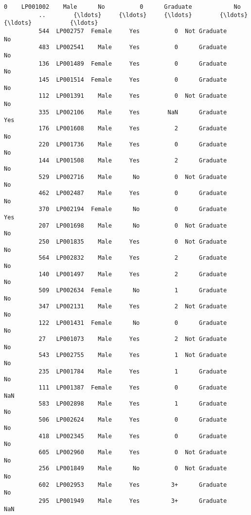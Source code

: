\documentclass[11pt]{article}
\begin{document}
\begin{Verbatim}[commandchars=\\\{\}]
          0    LP001002    Male      No          0      Graduate            No   
          ..        {\ldots}     {\ldots}     {\ldots}        {\ldots}           {\ldots}           {\ldots}   
          544  LP002757  Female     Yes          0  Not Graduate            No   
          483  LP002541    Male     Yes          0      Graduate            No   
          136  LP001489  Female     Yes          0      Graduate            No   
          145  LP001514  Female     Yes          0      Graduate            No   
          112  LP001391    Male     Yes          0  Not Graduate            No   
          335  LP002106    Male     Yes        NaN      Graduate           Yes   
          176  LP001608    Male     Yes          2      Graduate            No   
          220  LP001736    Male     Yes          0      Graduate            No   
          144  LP001508    Male     Yes          2      Graduate            No   
          529  LP002716    Male      No          0  Not Graduate            No   
          462  LP002487    Male     Yes          0      Graduate            No   
          370  LP002194  Female      No          0      Graduate           Yes   
          207  LP001698    Male      No          0  Not Graduate            No   
          250  LP001835    Male     Yes          0  Not Graduate            No   
          564  LP002832    Male     Yes          2      Graduate            No   
          140  LP001497    Male     Yes          2      Graduate            No   
          509  LP002634  Female      No          1      Graduate            No   
          347  LP002131    Male     Yes          2  Not Graduate            No   
          122  LP001431  Female      No          0      Graduate            No   
          27   LP001073    Male     Yes          2  Not Graduate            No   
          543  LP002755    Male     Yes          1  Not Graduate            No   
          235  LP001784    Male     Yes          1      Graduate            No   
          111  LP001387  Female     Yes          0      Graduate           NaN   
          583  LP002898    Male     Yes          1      Graduate            No   
          506  LP002624    Male     Yes          0      Graduate            No   
          418  LP002345    Male     Yes          0      Graduate            No   
          605  LP002960    Male     Yes          0  Not Graduate            No   
          256  LP001849    Male      No          0  Not Graduate            No   
          602  LP002953    Male     Yes         3+      Graduate            No   
          295  LP001949    Male     Yes         3+      Graduate           NaN   
          

\end{Verbatim}
\end{document}
